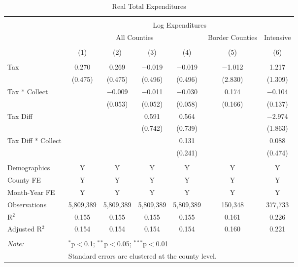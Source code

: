 
\begin{table}[!htbp] \centering 
  \caption{Real Total Expenditures} 
  \label{} 
\begin{tabular}{@{\extracolsep{5pt}}lcccccc} 
\\[-1.8ex]\hline 
\hline \\[-1.8ex] 
 & \multicolumn{6}{c}{Log Expenditures} \\ 
\cline{2-7} 
 & \multicolumn{4}{c}{All Counties} & Border Counties & Intensive \\ 
\\[-1.8ex] & (1) & (2) & (3) & (4) & (5) & (6)\\ 
\hline \\[-1.8ex] 
 Tax & 0.270 & 0.269 & $-$0.019 & $-$0.019 & $-$1.012 & 1.217 \\ 
  & (0.475) & (0.475) & (0.496) & (0.496) & (2.830) & (1.309) \\ 
  Tax * Collect &  & $-$0.009 & $-$0.011 & $-$0.030 & 0.174 & $-$0.104 \\ 
  &  & (0.053) & (0.052) & (0.058) & (0.166) & (0.137) \\ 
  Tax Diff &  &  & 0.591 & 0.564 &  & $-$2.974 \\ 
  &  &  & (0.742) & (0.739) &  & (1.863) \\ 
  Tax Diff * Collect &  &  &  & 0.131 &  & 0.088 \\ 
  &  &  &  & (0.241) &  & (0.474) \\ 
 \hline \\[-1.8ex] 
Demographics & Y & Y & Y & Y & Y & Y \\ 
County FE & Y & Y & Y & Y & Y & Y \\ 
Month-Year FE & Y & Y & Y & Y & Y & Y \\ 
Observations & 5,809,389 & 5,809,389 & 5,809,389 & 5,809,389 & 150,348 & 377,733 \\ 
R$^{2}$ & 0.155 & 0.155 & 0.155 & 0.155 & 0.161 & 0.226 \\ 
Adjusted R$^{2}$ & 0.154 & 0.154 & 0.154 & 0.154 & 0.160 & 0.221 \\ 
\hline 
\hline \\[-1.8ex] 
\textit{Note:}  & \multicolumn{6}{l}{$^{*}$p$<$0.1; $^{**}$p$<$0.05; $^{***}$p$<$0.01} \\ 
 & \multicolumn{6}{l}{Standard errors are clustered at the county level.} \\ 
\end{tabular} 
\end{table} 
